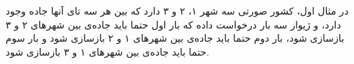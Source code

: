 \documentclass[11.5pt,a4paper,oneside]{article}
\begin{document}
\begin{problem}
\sampleIO

\begin{example}
%
\end{example}

\begin{example}
%
\end{example}

\begin{example}
%
\end{example}

\sampleIODescription
در مثال  اول، کشور صورتی سه شهر ۱، ۲ و ۳ دارد که بین هر سه تای آنها جاده وجود دارد،‌ و ژیوار سه بار درخواست داده که بار اول حتما باید جاده‌ی بین شهر‌های ۲ و ۳ باز‌سازی شود، بار دوم حتما باید جاده‌ی بین شهر‌های ۱ و ۲ بازسازی شود و بار سوم حتما باید جاده‌ی بین شهر‌های ۱ و ۳ بازسازی شود.
\end{problem}
\end{document}
